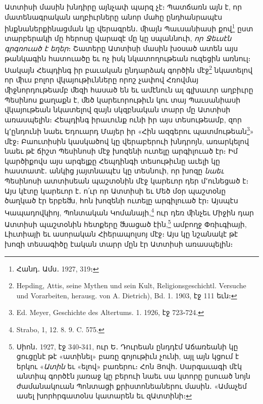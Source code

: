 \documentclass{article}
\begin{document}
{Ատտիսի մասին խնդիրը այնչափ պարզ չէ։ Պատճառն այն է, որ մատենագրական աղբիւրները անոր մահը ընդհանրապէս ինքնաներքինացման կը վերագրեն․ ﬕայն Պաւսանիասի քով\footnote{Հանդ․ Ամս․ 1927, 319։} ըստ տարբերակի մը հերոսը վարազէ մը կը սպաննուի, \emph{որ Ջեւսէն գրգռուած է եղեր}։ Շատերը Ատտիսի մասին խօսած ատեն այս թանկագին հատուածը եւ ոչ իսկ նկատողութեան ուզեցին առնուլ։ Սակայն Հեպդինգ իր բաւական ընդարձակ գործին մէջ\footnote{Hepding, Attis, seine Mythen und sein Kult, Religionsgeschichtl. Versuche und Vorarbeiten, herausg. von A. Dietrich), Bd. 1. 1903, էջ 111 եւն։} նկատելով որ ﬕւս բոլոր վկայութիւնները որոշ չափով Հռովմայ ﬕջնորդութեամբ ﬔզի հասած են եւ ամէնուն ալ գլխաւոր աղբիւրը Պեսինոս քաղաքն է, ﬔծ կարեւորութիւն կու տայ Պաւսանիասի վկայութեան նկատելով զայն սկզբնական տարր մը Ատտիսի առասպելին։ Հեպդինգ իրաւունք ունի իր այս տեսութեամբ, զոր կ՚ընդունի նաեւ Եդուարդ Մայեր իր «Հին ազգերու պատմութեան\footnote{Ed. Meyer, Geschichte des Altertums. 1. 1926, էջ 723֊724.}» մէջ։ Բաուտիսին կասկածով կը վերաբերուի խնդրոյն, առարկելով նաեւ թէ ճիշտ Պեսինոսի մէջ խոզենի ուտելը արգիլուած էր։ Իմ կարծիքովս այս արգելքը Հեպդինգի տեսութիւնը աւելի կը հաստատէ․ անկից յայտնապէս կը տեսնուի, որ խոզը \emph{նաեւ} Պեսինոսի ատտիսեան պաշտօնին մէջ կարեւոր դեր մ՚ունեցած է։ Այս կէտը կարեւոր է․ ո՛ւր որ Ատտիսի եւ Մեծ մօր պաշտօնը ծաղկած էր երբեﬓ, հոն խոզենի ուտելը արգիլուած էր։ Այսպէս Կապադովկիոյ, Պոնտական Կոմանայի,\footnote{Strabo, 1, 12. 8. 9. C. 575.} ուր դեռ ﬕնչեւ Միջին դար Ատտիսի պաշտօնին հետքերը ﬓացած էին,\footnote{Սիոն․ 1927, էջ 340֊341, ուր Ե․ Դուրեան ընդդէմ Աճառեանի կը ցուցընէ թէ «ատինել» բառը գոյութիւն չունի, այլ այն կցում է երկու «\emph{Ատին} եւ «ելով» բառերու։ Հոն Յովհ․ Սարգաւագի մէկ անտիպ գործէն յառաջ կը բերուի նաեւ սա կտորը ըսուած նոյն ժամանակուան Պոնտացի քրիստոնեաներու մասին․ «Ամաչեմ ասել խորհրգատօնս կատարեն եւ զԱտտինի։} ամբողջ Փռիւգիայի, Լիւտիայի եւ ասորական Հիերապոլսոյ մէջ։ Այս կը նշանակէ թէ խոզի տեսագիծը էական տարր մըն էր Ատտիսի առասպելին։

}
\end{document}
